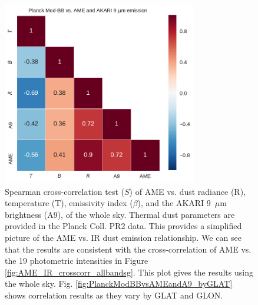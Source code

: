 \documentclass[preprint2,longabstract]{aastex}
\begin{document}
      \begin{figure}
        \label{fig:PlanckModBBvsAMEandA9}
        \includegraphics[width=85mm]{../Plots/PlanckModBBvsAMEandA9.pdf}
        \centering
        \caption{Spearman cross-correlation test ($S$) of AME vs. dust radiance (R), temperature (T),  emissivity index ($\beta$), and the AKARI 9~$\mu$m brightness (A9), of the whole sky. Thermal dust parameters are provided in the Planck Coll. PR2 data. This provides a simplified picture of the AME vs. IR dust emission relationship. We can see that the results are consistent with the cross-correlation of AME vs. the 19 photometric intensities in Figure \ref{fig:AME_IR_crosscorr_allbandsg}. This plot gives the results using the whole sky. Fig. \ref{fig:PlanckModBBvsAMEandA9_byGLAT} shows correlation results as they vary by GLAT and GLON. }
      \end{figure}
\end{document}
